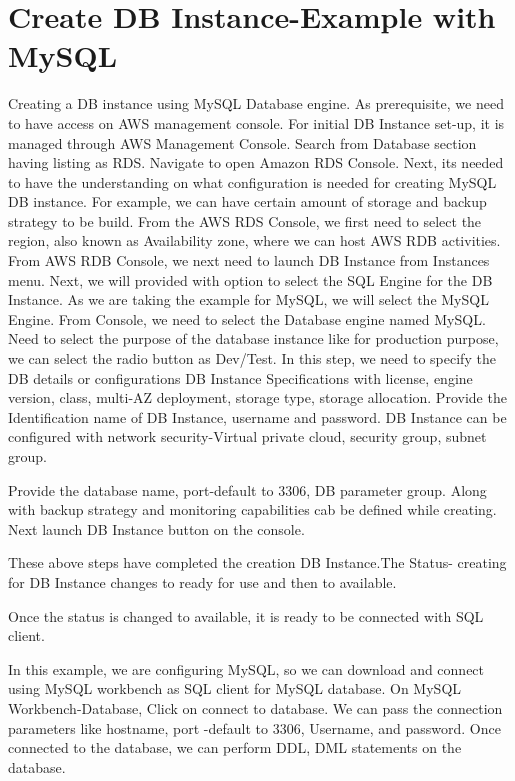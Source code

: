\section{Create DB Instance-Example with MySQL}
Creating a DB instance using MySQL Database engine.
As prerequisite, we need to have access on AWS management console.
For initial DB Instance set-up, it is managed through AWS Management
Console.
Search from Database section having listing as RDS.
Navigate to open Amazon RDS Console.
Next, its needed to have the understanding on what configuration is needed 
for creating MySQL DB instance. For example, we can have certain amount of 
storage and backup strategy to be build.
From the AWS RDS Console, we first need to select the region, also 
known as Availability zone, where we can host AWS RDB activities.
From AWS RDB Console, we next need to launch DB Instance from 
Instances menu.
Next, we will provided with option to select the SQL Engine for the DB 
Instance. As we are taking the example for MySQL, we will select the 
MySQL Engine.
From Console, we need to select the Database engine named MySQL.
Need to select the purpose of the database instance like for 
production purpose, we can select the radio button as Dev/Test.
In this step, we need to specify the DB details or configurations
DB Instance Specifications with license, engine version, class, multi-AZ 
deployment, storage type, storage allocation.
Provide the Identification name of DB Instance, username and password.
DB Instance can be configured with network security-Virtual private 
cloud, security group, subnet group.

Provide the database name, port-default to 3306, DB parameter group. 
Along with backup strategy and monitoring capabilities cab be defined 
while creating.
Next launch DB Instance button on the console.

These above steps have completed the creation DB Instance.The Status- 
creating for DB Instance changes to ready for use and then to available.

Once the status is changed to available, it is ready to be connected 
with SQL client.

In this example, we are configuring MySQL, so we can download and connect 
using MySQL workbench as SQL client for MySQL database. 
On MySQL Workbench-Database, Click on connect to database. We 
can pass the connection parameters like hostname, port -default to 3306, 
Username, and password.
Once connected to the database, we can perform DDL, DML 
statements on the database.

